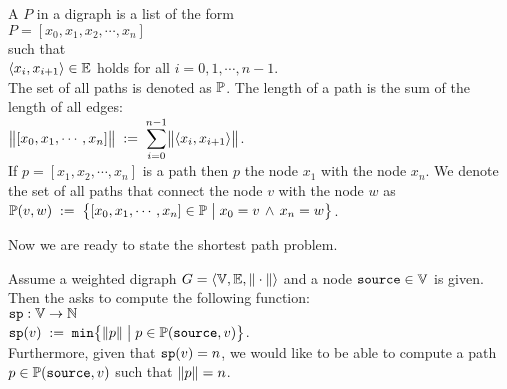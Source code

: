 \begin{Definition}
 A  $P$ in a digraph  is a list of the form 
\\[0.2cm]
\hspace*{1.3cm} 
$P = [ x_0, x_1, x_2, \cdots, x_n ]$ 
\\[0.2cm]
such that
\\[0.2cm]
\hspace*{1.3cm} $\pair(x_i,x_{i+1}) \in \edges$ \quad holds for all $i = 0, 1, \cdots, n-1$. 
\\[0.2cm]
The set of all paths is denoted as ${\mathbb P}$.
The length of a path is the sum of the length of all edges:
\\[0.2cm]
\hspace*{1.3cm}
$\ds\Weight{[x_0,x_1, \cdots, x_n]} \df \sum\limits_{i=0}^{n-1} \Weight{\pair(x_i,x_{i+1})}$. 
\\[0.2cm]
If  $p = [x_1, x_2, \cdots, x_n]$ is a path then  $p$  the node $x_1$ with the node
$x_n$.  We denote the set of all paths that connect the node $v$ with the node $w$ as
\\[0.2cm]
\hspace*{1.3cm} 
 ${\mathbb P}(v,w) \;:=\; \bigl\{ [x_0, x_1, \cdots, x_n] \in {\mathbb P} \bigm| x_0 = v \,\wedge\, x_n = w \bigr\}$.
\end{Definition}

\noindent
Now we are ready to state the shortest path problem.

\begin{Definition} \lb
  Assume a weighted digraph  
  $G = \langle {\mathbb V}, {\mathbb E}, \|\cdot\| \rangle$ 
  and a node $\mbox{\tt source} \in {\mathbb V}$ is given.  Then the  
  asks to compute the following function:
  \\[0.2cm]
  \hspace*{1.3cm} $\mathtt{sp}: {\mathbb V} \rightarrow {\mathbb N}$ \\[0.1cm]
  \hspace*{1.3cm} $\mathtt{sp}(v) \;:=\; \texttt{min}\bigl\{ \|p\| \bigm| p \in {\mathbb P}(\mbox{\tt source},v) \bigr\}$.
  \\[0.2cm]
  Furthermore, given that $\mathtt{sp}(v) = n$, we would like to be able to compute a path 
  $p \in {\mathbb P}(\mbox{\tt source},v)$ such that $\|p\| = n$.
  \eox
\end{Definition}

